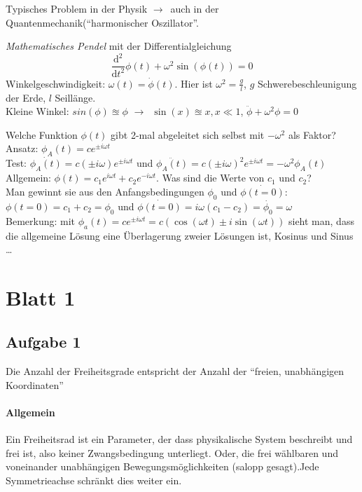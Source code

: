 \documentclass[oneside]{book}
\theoremstyle{definition}
\newcommand{\conseq}{$\rightarrow$~}
\newcommand{\QM}{Quantenmechanik}
\newcommand{\Dgl}{Differentialgleichung}
\renewcommand{\d}{\mathrm d}
\begin{document}
Typisches Problem in der Physik \conseq auch in der \QM ("`harmonischer Oszillator"'.
 
\textit{Mathematisches Pendel} mit der \Dgl
$$ \frac{\d^2}{\d t^2} \phi(t) + \omega^2 \sin(\phi(t)) = 0$$
Winkelgeschwindigkeit: $\omega(t) = \dot\phi(t)$. Hier ist $\omega^2 = \frac{g}{l}$, $g$ Schwerebeschleunigung der Erde, $l$ Seillänge.\\
Kleine Winkel: $sin(\phi) \approxeq \phi$ \conseq $\sin(x) \approxeq x, x \ll 1$, $\ddot{\phi} + \omega^2 \phi = 0$

Welche Funktion $\phi(t)$ gibt 2-mal abgeleitet sich selbst mit $-\omega^2$ als Faktor?\\
Ansatz: $\phi_A(t) = c e^{\pm i \omega t}$\\
Test: $\dot{\phi_A(t)} = c (\pm i \omega) e^{\pm i \omega t}$ und $\ddot{\phi_A(t)} = c (\pm i \omega)^2 e^{\pm i \omega t} = - \omega^2 \phi_A(t)$\\
Allgemein: $\phi(t) = c_1 e^{i \omega t} + c_2 e^{- i \omega t}$. Was sind die Werte von $c_1$ und $c_2$?\\
Man gewinnt sie aus den Anfangsbedingungen $\phi_0$ und $\dot{\phi(t = 0)}$: $\phi(t = 0) = c_1 + c_2 = \phi_0$ und $\dot{\phi(t = 0)} = i \omega (c_1 - c_2) = \dot{\phi_0} = \omega$\\
Bemerkung: mit $\phi_a(t) = c e^{\pm i \omega t} = c (\cos(\omega t) \pm i \sin(\omega t))$ sieht man, dass die allgemeine Lösung eine Überlagerung zweier Lösungen ist, Kosinus und Sinus \dots

\section{Blatt 1}

\subsection{Aufgabe 1}
Die Anzahl der Freiheitsgrade entspricht der Anzahl der "`freien, unabhängigen Koordinaten"'

\paragraph{Allgemein} Ein Freiheitsrad ist ein Parameter, der dass physikalische System beschreibt und frei ist, also keiner Zwangsbedingung unterliegt. Oder, die frei wählbaren und voneinander unabhängigen Bewegungsmöglichkeiten (salopp gesagt).Jede Symmetrieachse schränkt dies weiter ein.\\
\end{document}
